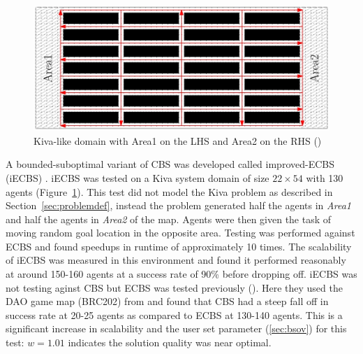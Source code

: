 \documentclass[a4paper,11pt]{article}
\begin{document}
\begin{figure}[!htb]
	\centering
	\centering
	\includegraphics[width=0.9\linewidth]{graphics/ecbskivadomain}
	\caption{Kiva-like domain with Area1 on the LHS and Area2 on the RHS (\cite{cohen2016improved})}
	\label{fig:cbskivadomain}
\end{figure}


A bounded-suboptimal variant of CBS was developed called improved-ECBS (iECBS) \cite{cohen2016improved}. iECBS was tested on a Kiva system domain of size $22 \times 54$ with 130 agents (Figure~\ref{fig:cbskivadomain}). This test did not model the Kiva problem as described in Section~\ref{sec:problemdef}, instead the problem generated half the agents in \textit{Area1} and half the agents in \textit{Area2} of the map. Agents were then given the task of moving random goal location in the opposite area. Testing was performed against ECBS and found speedups in runtime of approximately 10 times. The scalability of iECBS was measured in this environment and found it performed reasonably at around 150-160 agents at a success rate of 90\% before dropping off. iECBS was not testing aginst CBS but ECBS was tested previously (\cite{barer2014suboptimal}). Here they used the DAO game map (BRC202) from \cite{sturtevant2012benchmarks} and found that CBS had a steep fall off in success rate at 20-25 agents as compared to ECBS at 130-140 agents. This is a significant increase in scalability and the user set parameter (\ref{sec:bsov}) for this test: $w = 1.01$ indicates the solution quality was near optimal.

\end{document}
